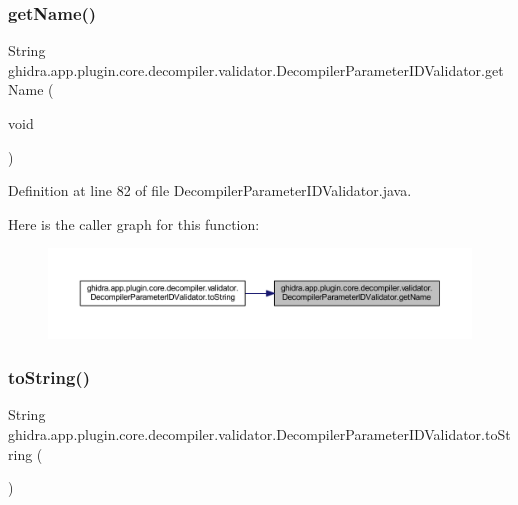 \subsubsection{\texorpdfstring{getName()}{getName()}}
{\footnotesize\ttfamily String ghidra.\+app.\+plugin.\+core.\+decompiler.\+validator.\+Decompiler\+Parameter\+I\+D\+Validator.\+get\+Name (\begin{DoxyParamCaption}\item[{void}]{ }\end{DoxyParamCaption})\hspace{0.3cm}{\ttfamily [inline]}}



Definition at line 82 of file Decompiler\+Parameter\+I\+D\+Validator.\+java.

Here is the caller graph for this function\+:
\nopagebreak
\begin{figure}[H]
\begin{center}
\leavevmode
\includegraphics[width=350pt]{classghidra_1_1app_1_1plugin_1_1core_1_1decompiler_1_1validator_1_1_decompiler_parameter_i_d_validator_a0ef67f4e424402ced87f3e21b5b4c400_icgraph}
\end{center}
\end{figure}
\mbox{\label{classghidra_1_1app_1_1plugin_1_1core_1_1decompiler_1_1validator_1_1_decompiler_parameter_i_d_validator_a4a174bda01fce2851a653bef145fe4a3}} 
\subsubsection{\texorpdfstring{toString()}{toString()}}
{\footnotesize\ttfamily String ghidra.\+app.\+plugin.\+core.\+decompiler.\+validator.\+Decompiler\+Parameter\+I\+D\+Validator.\+to\+String (\begin{DoxyParamCaption}{ }\end{DoxyParamCaption})\hspace{0.3cm}{\ttfamily [inline]}}



